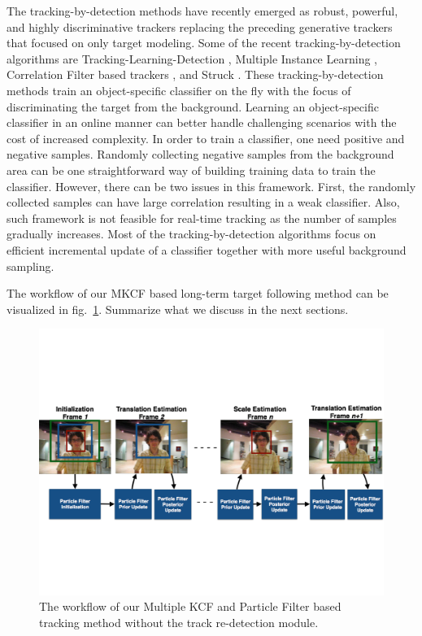 \documentclass[10pt,twocolumn,letterpaper]{article}
\begin{document}
The tracking-by-detection methods have recently emerged as robust,
powerful, and highly discriminative trackers replacing the preceding
generative trackers that focused on only target modeling. Some of the
recent tracking-by-detection algorithms are
Tracking-Learning-Detection \cite{kalal2012tracking}, Multiple
Instance Learning \cite{babenko2009visual}, Correlation Filter based
trackers \cite{bolme2010visual,henriques2015high}, and Struck
\cite{hare2012efficient}. These tracking-by-detection methods train an
object-specific classifier on the fly with the focus of discriminating
the target from the background. Learning an object-specific classifier
in an online manner can better handle challenging scenarios with the
cost of increased complexity. In order to train a classifier, one need
positive and negative samples. Randomly collecting negative samples
from the background area can be one straightforward way of building
training data to train the classifier. However, there can be two
issues in this framework. First, the randomly collected samples can
have large correlation resulting in a weak classifier. Also, such
framework is not feasible for real-time tracking as the number of
samples gradually increases. Most of the tracking-by-detection
algorithms focus on efficient incremental update of a classifier
together with more useful background sampling.

The workflow of our MKCF based long-term target following method can be visualized in fig.~\ref{Workflow_figure}. Summarize what we discuss in the next sections.
\begin{figure}[!t]
\includegraphics[width=\textwidth]{figures/Workflow_MKCF+PF.pdf}
\caption{The workflow of our Multiple KCF and Particle Filter based tracking method without the track re-detection module.}
\label{Workflow_figure}
\end{figure}
\end{document}
